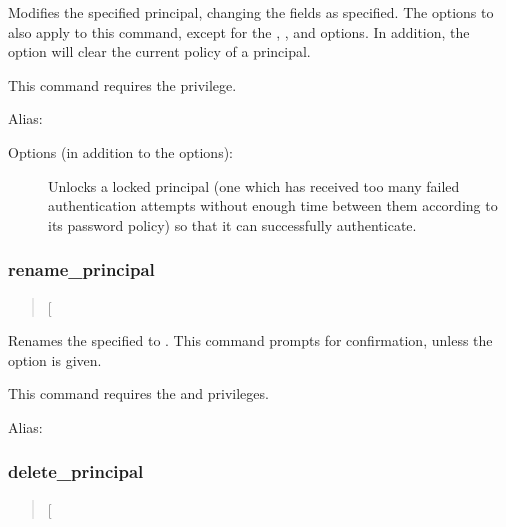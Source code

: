 \documentclass[letterpaper,10pt,english]{sphinxmanual}
\begin{document}
Modifies the specified principal, changing the fields as specified.
The options to  also apply to this command, except
for the , , and  options.  In addition, the
option  will clear the current policy of a principal.

This command requires the  privilege.

Alias: 

Options (in addition to the  options):
\begin{description}
\item[{}] \leavevmode
Unlocks a locked principal (one which has received too many failed
authentication attempts without enough time between them according
to its password policy) so that it can successfully authenticate.

\end{description}
\label{\detokenize{admin/admin_commands/kadmin_local:modify-principal-end}}

\subsubsection{rename\_principal}
\label{\detokenize{admin/admin_commands/kadmin_local:modify-principal-end}}\label{\detokenize{admin/admin_commands/kadmin_local:rename-principal}}\label{\detokenize{admin/admin_commands/kadmin_local:id3}}\begin{quote}

 {[}\sphinxstylestrong{-force}{]}  
\end{quote}

Renames the specified  to .  This
command prompts for confirmation, unless the  option is
given.

This command requires the  and  privileges.

Alias: 

\label{\detokenize{admin/admin_commands/kadmin_local:rename-principal-end}}

\subsubsection{delete\_principal}
\label{\detokenize{admin/admin_commands/kadmin_local:id4}}\label{\detokenize{admin/admin_commands/kadmin_local:delete-principal}}\label{\detokenize{admin/admin_commands/kadmin_local:rename-principal-end}}\begin{quote}

 {[}\sphinxstylestrong{-force}{]} 
\end{quote}
\end{document}
